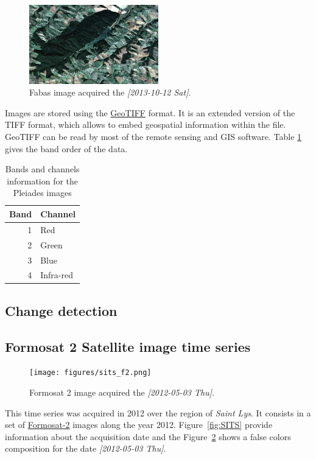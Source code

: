 \documentclass[a4paper,11pt,DIV=18]{scrartcl}
\begin{document}
\begin{figure}[htbp]
\centering
\includegraphics[width=0.5\textwidth]{./figures/quicklook_fabas_12_10_2013.jpg}
\caption{\label{fig:org11aaaf7}
Fabas image acquired the \textit{[2013-10-12 Sat]}.}
\end{figure}

Images are stored using the \href{https://trac.osgeo.org/geotiff/}{GeoTIFF} format.  It is an extended version
of  the TIFF  format,  which allows  to  embed geospatial  information
within the file. GeoTIFF can be read by most of the remote sensing and
GIS software. Table \ref{tab:orgbcbaf3d} gives the band order of the data.

\begin{table}[htbp]
\caption{\label{tab:orgbcbaf3d}
Bands and channels information for the Pleiades images}
\centering
\begin{tabular}{rl}
\toprule
Band & Channel\\
\midrule
1 & Red\\
2 & Green\\
3 & Blue\\
4 & Infra-red\\
\bottomrule
\end{tabular}
\end{table}
\subsection{Change detection}
\label{sec:orga656e0d}
\subsection{Formosat 2 Satellite image time series}
\label{sec:org95910f2}
\begin{figure}[htbp]
\centering
\texttt{[image: figures/sits\_f2.png]}
\caption{\label{fig:org69c30ba}
Formosat 2 image acquired the \textit{[2012-05-03 Thu]}.}
\end{figure}

This time series was acquired in 2012 over the region of \emph{Saint Lys}. It
consists  in  a  set  of   \href{http://www.satimagingcorp.com/satellite-sensors/other-satellite-sensors/formosat-2/}{Formosat-2}  images  along  the  year  2012.
Figure~\ref{fig:SITS} provide information  about the acquisition
date and the Figure~\ref{fig:org69c30ba} shows a false colors composition for
the date \textit{[2012-05-03 Thu]}.
\end{document}
